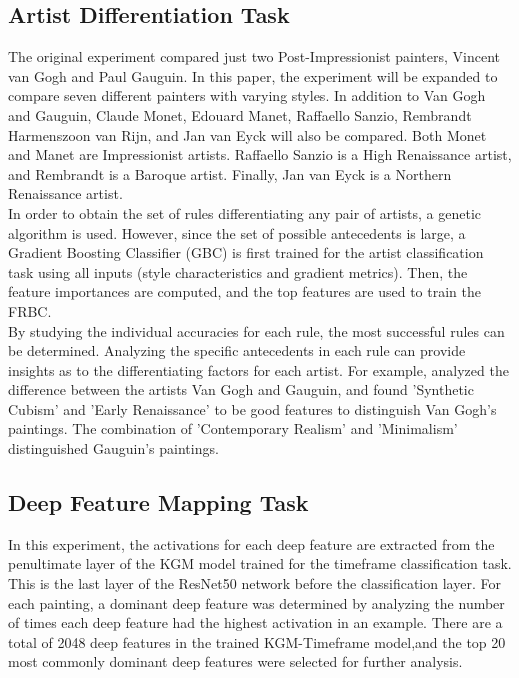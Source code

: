 \documentclass{article}
\begin{document}
\vspace{-5pt}

\subsection{Artist Differentiation Task} 
The original experiment compared just two Post-Impressionist painters, Vincent van Gogh and Paul Gauguin. In this paper, the experiment will be expanded to compare seven different painters with varying styles. In addition to Van Gogh and Gauguin, Claude Monet, Edouard Manet, Raffaello Sanzio, Rembrandt Harmenszoon van Rijn, and Jan van Eyck will also be compared. Both Monet and Manet are Impressionist artists. Raffaello Sanzio is a High Renaissance artist, and Rembrandt is a Baroque artist. Finally, Jan van Eyck is a Northern Renaissance artist. \\

In order to obtain the set of rules differentiating any pair of artists, a genetic algorithm is used. However, since the set of possible antecedents is large, a Gradient Boosting Classifier (GBC) is first trained for the artist classification task using all inputs (style characteristics and gradient metrics). Then, the feature importances are computed, and the top features are used to train the FRBC.\\

By studying the individual accuracies for each rule, the most successful rules can be determined. Analyzing the specific antecedents in each rule can provide insights as to the differentiating factors for each artist. For example, \cite{Fuminides} analyzed the difference between the artists Van Gogh and Gauguin, and found 'Synthetic Cubism' and 'Early Renaissance' to be good features to distinguish Van Gogh's paintings. The combination of 'Contemporary Realism' and 'Minimalism' distinguished Gauguin's paintings.

\subsection{Deep Feature Mapping Task}
In this experiment, the activations for each deep feature are extracted from the penultimate layer of the KGM model trained for the timeframe classification task. This is the last layer of the ResNet50 network before the classification layer. For each painting, a dominant deep feature was determined by analyzing the number of times each deep feature had the highest activation in an example. There are a total of 2048 deep features in the trained KGM-Timeframe model,and the top 20 most commonly dominant deep features were selected for further analysis.\\
\end{document}
